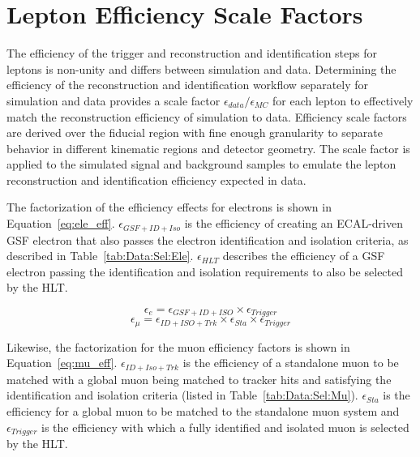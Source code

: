 \chapter{Lepton Efficiency Scale Factors}\label{ch:eff}
The efficiency of the trigger and reconstruction and identification steps for leptons is non-unity and differs between simulation and data. Determining the efficiency of the reconstruction and identification workflow separately for simulation and data provides a scale factor $\epsilon_{data}/\epsilon_{MC}$ for each lepton to effectively match the reconstruction efficiency of simulation to data. Efficiency scale factors are derived over the fiducial region with fine enough granularity to separate behavior in different kinematic regions and detector geometry. The scale factor is applied to the simulated signal and background samples to emulate the lepton reconstruction and identification efficiency expected in data.


The factorization of the efficiency effects for electrons is shown in Equation~\ref{eq:ele_eff}. $\epsilon_{GSF+ID+Iso}$ is the efficiency of creating an ECAL-driven GSF electron that also passes the electron identification and isolation criteria, as described in Table~\ref{tab:Data:Sel:Ele}. $\epsilon_{HLT}$ describes the efficiency of a GSF electron passing the identification and isolation requirements to also be selected by the HLT. 

\begin{equation}
  \epsilon_{e} = \epsilon_{GSF+ID+ISO} \times \epsilon_{Trigger}
  \label{eq:ele_eff}
\end{equation}
\begin{equation}
  \epsilon_{\mu} = \epsilon_{ID+ISO+Trk} \times  \epsilon_{Sta} \times \epsilon_{Trigger}
  \label{eq:mu_eff}
\end{equation}

Likewise, the factorization for the muon efficiency factors is shown in Equation~\ref{eq:mu_eff}. $\epsilon_{ID+Iso+Trk}$ is the efficiency of a standalone muon to be matched with a global muon being matched to tracker hits and satisfying the identification and isolation criteria (listed in Table~\ref{tab:Data:Sel:Mu}). $\epsilon_{Sta}$ is the efficiency for a global muon to be matched to the standalone muon system and 
$\epsilon_{Trigger}$ is the efficiency with which a fully identified and isolated muon is selected by the HLT. 


